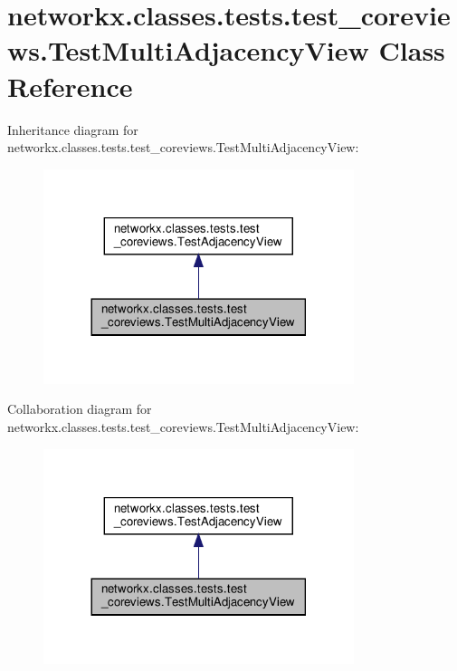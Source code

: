 \hypertarget{classnetworkx_1_1classes_1_1tests_1_1test__coreviews_1_1TestMultiAdjacencyView}{}\section{networkx.\+classes.\+tests.\+test\+\_\+coreviews.\+Test\+Multi\+Adjacency\+View Class Reference}
\label{classnetworkx_1_1classes_1_1tests_1_1test__coreviews_1_1TestMultiAdjacencyView}


Inheritance diagram for networkx.\+classes.\+tests.\+test\+\_\+coreviews.\+Test\+Multi\+Adjacency\+View\+:
\nopagebreak
\begin{figure}[H]
\begin{center}
\leavevmode
\includegraphics[width=257pt]{classnetworkx_1_1classes_1_1tests_1_1test__coreviews_1_1TestMultiAdjacencyView__inherit__graph}
\end{center}
\end{figure}


Collaboration diagram for networkx.\+classes.\+tests.\+test\+\_\+coreviews.\+Test\+Multi\+Adjacency\+View\+:
\nopagebreak
\begin{figure}[H]
\begin{center}
\leavevmode
\includegraphics[width=257pt]{classnetworkx_1_1classes_1_1tests_1_1test__coreviews_1_1TestMultiAdjacencyView__coll__graph}
\end{center}
\end{figure}
